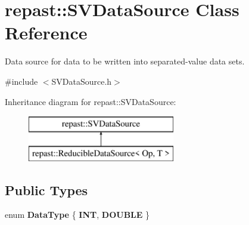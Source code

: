 \hypertarget{classrepast_1_1_s_v_data_source}{\section{repast\-:\-:S\-V\-Data\-Source Class Reference}
\label{classrepast_1_1_s_v_data_source}
}


Data source for data to be written into separated-\/value data sets.  




{\ttfamily \#include $<$S\-V\-Data\-Source.\-h$>$}

Inheritance diagram for repast\-:\-:S\-V\-Data\-Source\-:\begin{figure}[H]
\begin{center}
\leavevmode
\includegraphics[height=2.000000cm]{classrepast_1_1_s_v_data_source}
\end{center}
\end{figure}
\subsection*{Public Types}
\begin{DoxyCompactItemize}
\item 
enum {\bfseries Data\-Type} \{ {\bfseries I\-N\-T}, 
{\bfseries D\-O\-U\-B\-L\-E}
 \}
\end{DoxyCompactItemize}
